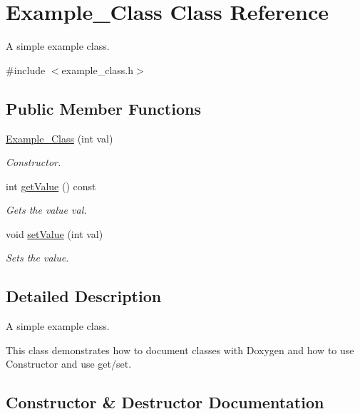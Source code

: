 \hypertarget{classExample__Class}{}\section{Example\+\_\+\+Class Class Reference}
\label{classExample__Class}


A simple example class.  




{\ttfamily \#include $<$example\+\_\+class.\+h$>$}

\subsection*{Public Member Functions}
\begin{DoxyCompactItemize}
\item 
\hyperlink{classExample__Class_a44450559c0691f9806b057e0e3de36e6}{Example\+\_\+\+Class} (int val)
\begin{DoxyCompactList}\small\item\em Constructor. \end{DoxyCompactList}\item 
int \hyperlink{classExample__Class_a029eda159ecb5e6f2fbb39c549305019}{get\+Value} () const
\begin{DoxyCompactList}\small\item\em Gets the value val. \end{DoxyCompactList}\item 
void \hyperlink{classExample__Class_a78b4cb3bc740ebbae7a263711efce0df}{set\+Value} (int val)
\begin{DoxyCompactList}\small\item\em Sets the value. \end{DoxyCompactList}\end{DoxyCompactItemize}


\subsection{Detailed Description}
A simple example class. 

This class demonstrates how to document classes with Doxygen and how to use Constructor and use get/set. 

\subsection{Constructor \& Destructor Documentation}
\mbox{\label{classExample__Class_a44450559c0691f9806b057e0e3de36e6}} 
